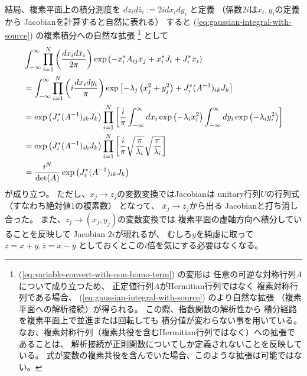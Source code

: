 結局、複素平面上の積分測度を
$dz_i d\bar{z}_i := 2 i dx_i dy_i$
と定義
（係数$2 i$は$x_i, y_i$の定義から
Jacobianを計算すると自然に表れる）
すると
(\ref{eq:gaussian-integral-with-source})
の複素積分への自然な拡張
\footnote{
    (\ref{eq:variable-convert-with-non-homo-term})
    の変形は
    任意の可逆な対称行列$A$について成り立つため、
    正定値行列$A$がHermitian行列ではなく
    複素対称行列である場合、
    (\ref{eq:gaussian-integral-with-source})
    のより自然な拡張
    （複素平面への解析接続）が得られる。
    この際、指数関数の解析性から
    積分経路を複素平面上で並進または回転しても
    積分値が変わらない事を用いている。
    なお、複素対称行列（複素共役を含むHermitian行列ではなく）への拡張であることは、
    解析接続が正則関数についてしか定義されないことを反映している。
    式が変数の複素共役を含んでいた場合、このような拡張は可能ではない。
}
として
\begin{align}
    &
    \int_{-\infty}^{\infty}
    \prod_{i=1}^{N}
    \left(
        \frac{dx_i d\bar{x}_i}{2\pi}
    \right)
    \exp \left(
        - x^*_i A_{ij} x_j
        + x_i^* J_i
        + J^*_i x_i
    \right)
\notag\\&=
    \int_{-\infty}^{\infty}
    \prod_{i=1}^{N}
    \left(
        i \frac{dx_i dy_i}{\pi}
    \right)
    \exp \left[
        - \lambda_j
        \left( x^2_j + y_j^2 \right)
        + J^*_i (A^{-1})_{ik} J_k
    \right]
\notag\\&=
    \exp \left(
        J^*_i (A^{-1})_{ik} J_k
    \right)
    \prod_{i=1}^{N}\left[
        \frac{i}{\pi}
    \int_{-\infty}^{\infty}
        dx_i
        \exp \left(
            - \lambda_i
            x^2_i
        \right)
    \int_{-\infty}^{\infty}
        dy_i
        \exp \left(
            - \lambda_i
            y_i^2 
        \right)
    \right]
\notag\\&=
    \exp \left(
        J^*_i (A^{-1})_{ik} J_k
    \right)
    \prod_{i=1}^{N}
    \left[
        \frac{i}{\pi}
        \sqrt{\frac{\pi}{\lambda_i}}
        \sqrt{\frac{\pi}{\lambda_i}}
    \right]
\notag\\&=
    \frac{ i^N }{ \det(A) }
    \exp \left(
        J^*_i (A^{-1})_{ik} J_k
    \right)
\end{align}
が成り立つ。
ただし、$x_j \to z_j$の変数変換ではJacobianは
unitary行列$U$の行列式
（すなわち絶対値$1$の複素数）
となって、
$\bar{x}_j \to \bar{z}_j$から出る
Jacobianと打ち消し合った。
また、$z_j \to (x_j, y_j)$の変数変換では
複素平面の虚軸方向へ積分していることを反映して
Jacobian $2i$が現れるが、
むしろ$y$を純虚に取って
$z = x + y, \bar{z} = x - y$
としておくとこの$i$倍を気にする必要はなくなる。

